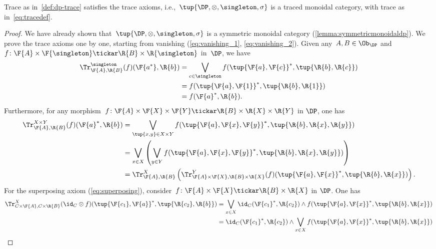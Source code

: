\begin{lemma}
Trace as in~\cref{def:dp-trace} satisfies the trace axioms, i.e.,~$\tup{\DP, \otimes, \singleton, \sigma}$ is a traced monoidal category, with trace as in~\cref{eq:tracedef}.
\end{lemma}
\begin{proof}
We have already shown that~$\tup{\DP,\otimes,\singleton,\sigma}$ is a symmetric monoidal category (\cref{lemma:symmetricmonoidaldp}).
We prove the trace axioms one by one, starting from vanishing (\cref{eq:vanishing_1}, \cref{eq:vanishing_2}). Given any~$A,B\in \Ob_\DP$ and~$f\colon \F{A}\times \F{\singleton}\tickar \R{B}\times \R{\singleton}$ in~$\DP$, we have
\begin{equation}
    \begin{aligned}
        \Tr_{\F{A},\R{B}}^{\singleton}(f)(\F{a^*},\R{b})&=\bigvee_{c\in \singleton}f(\tup{\F{a},\F{c}}^*,\tup{\R{b},\R{c}})\\
        &=f(\tup{\F{a},\F{1}}^*,\tup{\R{b},\R{1}})\\
        &=f(\F{a}^*,\R{b}).
    \end{aligned}
\end{equation}
Furthermore, for any morphism~$f\colon \F{A}\times \F{X}\times \F{Y} \tickar \R{B}\times \R{X} \times \R{Y}$ in $\DP$, one has
\begin{equation}
    \begin{aligned}
        \Tr_{\F{A},\R{B}}^{X\times Y}(f)(\F{a}^*,\R{b})&=\bigvee_{\tup{x,y} \in X\times Y} f(\tup{\F{a},\F{x},\F{y}}^*,\tup{\R{b},\R{x},\R{y}})\\
        &=\bigvee_{x \in X}\left(\bigvee_{y \in Y} f(\tup{\F{a},\F{x},\F{y}}^*,\tup{\R{b},\R{x},\R{y}})\right)\\
        &=\Tr_{\F{A},\R{B}}^X\left(
        \Tr_{\F{A}\times \F{X},\R{B}\times \R{X}}^Y(f)(\tup{\F{a},\F{x}}^*,\tup{\R{b},\R{x}})\right).
    \end{aligned}
\end{equation}
For the superposing axiom (\cref{eq:superposing}), consider~$f\colon \F{A}\times \F{X}\tickar \R{B}\times \R{X}$ in $\DP$. One has
\begin{equation}
    \begin{aligned}
        \Tr_{C\times \F{A},C\times \R{B}}^{X}(\id_C\otimes f)(\tup{\F{c_1},\F{a}}^*,\tup{\R{c_2},\R{b}})&=\bigvee_{x\in X} \id_C(\F{c_1}^*,\R{c_2})\wedge f(\tup{\F{a},\F{x}}^*,\tup{\R{b},\R{x}})\\
        &=\id_C(\F{c_1}^*,\R{c_2}) \wedge \bigvee_{x\in X} f(\tup{\F{a},\F{x}}^*,\tup{\R{b},\R{x}})\\

\end{aligned}
\end{equation}
\end{proof}
